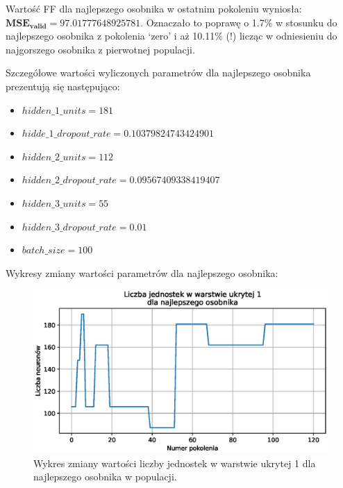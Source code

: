 \documentclass[a4paper,12pt]{article}
\numberwithin{figure}{section}
\begin{document}
    \bigskip

    Wartość FF dla najlepszego osobnika w ostatnim pokoleniu wyniosła: $\bm{MSE_{valid} = 97.01777648925781}$. Oznaczało to poprawę o 1.7\% w stosunku do najlepszego osobnika z pokolenia `zero' i aż 10.11\% (!) licząc w odniesieniu do najgorszego osobnika z pierwotnej populacji.

    \bigskip

    Szczegółowe wartości wyliczonych parametrów dla najlepszego osobnika prezentują się następująco:
    \begin{itemize}
        \item $hidden\_1\_units = 181$
        \item $hidde\_1\_dropout\_rate = 0.10379824743424901$
        \item $hidden\_2\_units = 112$
        \item $hidden\_2\_dropout\_rate = 0.09567409338419407$
        \item $hidden\_3\_units = 55$
        \item $hidden\_3\_dropout\_rate = 0.01$
        \item $batch\_size = 100$
    \end{itemize}

    \bigskip

    Wykresy zmiany wartości parametrów dla najlepszego osobnika:

    \bigskip

    \begin{figure}[H]
        \centering
        \includegraphics[width=\textwidth]{g_a_best_hidden_1_units}
        \caption{Wykres zmiany wartości liczby jednostek w warstwie ukrytej 1 dla najlepszego osobnika w populacji.}
        \label{fig:g_a_best_hidden_1_units}
    \end{figure}
\end{document}
